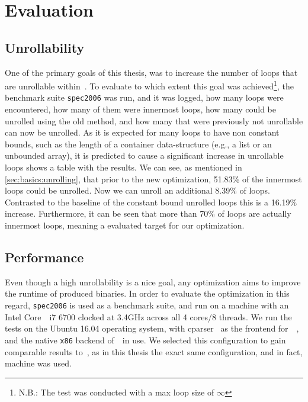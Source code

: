 \chapter{Evaluation}\label{sec:eval}

\section{Unrollability}\label{sec:eval:unrollability}

One of the primary goals of this thesis, was to increase the number of loops that are unrollable within~\libFIRM.
To evaluate to which extent this goal was achieved\footnote{N.B.: The test was conducted with a max loop size of $\infty$}, the benchmark suite \texttt{spec2006} was run, and it was logged, how many loops were encountered, how many of them were innermost loops, how many could be unrolled using the old method, and how many that were previously not unrollable can now be unrolled.
As it is expected for many loops to have non constant bounds, such as the length of a container data-structure (e.g., a list or an unbounded array), it is predicted to cause a significant increase in unrollable loops
 shows a table with the results.
We can see, as mentioned in \cref{sec:basics:unrolling}, that prior to the new optimization, 51.83\% of the innermost loops could be unrolled.
Now we can unroll an additional 8.39\% of loops.
Contrasted to the baseline of the constant bound unrolled loops this is a 16.19\% increase.
Furthermore, it can be seen that more than 70\% of loops are actually innermost loops, meaning a evaluated target for our optimization.



\section{Performance}\label{sec:eval:perf}

Even though a high unrollability is a nice goal, any optimization aims to improve the runtime of produced binaries.
In order to evaluate the optimization in this regard, \texttt{spec2006} is used as a benchmark suite, and run on a machine with an Intel Core~\textregistered~i7 6700 clocked at 3.4GHz across all 4 cores/8 threads.
We run the tests on the Ubuntu 16.04 operating system, with cparser~\cite{cparser} as the frontend for~\libFIRM~, and the native \texttt{x86} backend of~\libFIRM~in use.
We selected this configuration to gain comparable results to~\cite{aebi18bachelorarbeit}, as in this thesis the exact same configuration, and in fact, machine was used.

